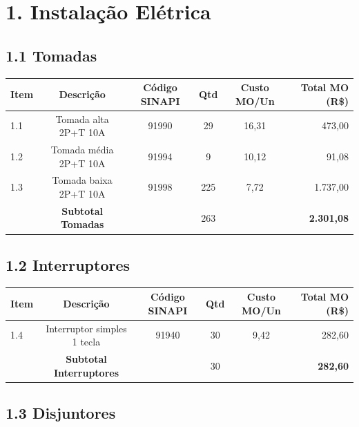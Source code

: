 \documentclass[12pt,a4paper]{article}
\renewenvironment{table}%
{\begin{center}%
\scriptsize%
\addtolength{\tabcolsep}{-2pt}%
}%
{\end{center}}
\begin{document}
\pagebreak

\section{1. Instalação Elétrica}

\subsection{1.1 Tomadas}

\begin{table}
\centering
\begin{tabular}{lccccr}
\toprule
\textbf{Item} & \textbf{Descrição} & \textbf{Código SINAPI} & \textbf{Qtd} & \textbf{Custo MO/Un} & \textbf{Total MO (R\$)} \\
\midrule
1.1 & Tomada alta 2P+T 10A & 91990 & 29 & 16,31 & 473,00 \\
1.2 & Tomada média 2P+T 10A & 91994 & 9 & 10,12 & 91,08 \\
1.3 & Tomada baixa 2P+T 10A & 91998 & 225 & 7,72 & 1.737,00 \\
\midrule
 & \textbf{Subtotal Tomadas} & & 263 & & \textbf{2.301,08} \\
\bottomrule
\end{tabular}
\end{table}

\subsection{1.2 Interruptores}

\begin{table}
\centering
\begin{tabular}{lccccr}
\toprule
\textbf{Item} & \textbf{Descrição} & \textbf{Código SINAPI} & \textbf{Qtd} & \textbf{Custo MO/Un} & \textbf{Total MO (R\$)} \\
\midrule
1.4 & Interruptor simples 1 tecla & 91940 & 30 & 9,42 & 282,60 \\
\midrule
 & \textbf{Subtotal Interruptores} & & 30 & & \textbf{282,60} \\
\bottomrule
\end{tabular}
\end{table}

\subsection{1.3 Disjuntores}
\end{document}
